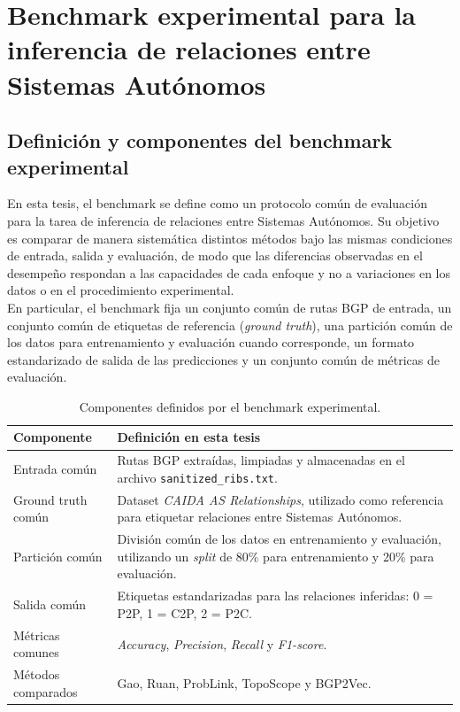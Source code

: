 \section{Benchmark experimental para la inferencia de relaciones entre Sistemas Autónomos} \label{sec:Benchmark_section}
\subsection{Definición y componentes del benchmark experimental}
\label{sec:definicion_benchmark}

En esta tesis, el benchmark se define como un protocolo común de evaluación para la tarea de inferencia de relaciones entre Sistemas Autónomos. 
Su objetivo es comparar de manera sistemática distintos métodos bajo las mismas condiciones de entrada, salida y evaluación, de modo que las diferencias 
observadas en el desempeño respondan a las capacidades de cada enfoque y no a variaciones en los datos o en el procedimiento experimental.\\

En particular, el benchmark fija un conjunto común de rutas BGP de entrada, un conjunto común de etiquetas de referencia (\textit{ground truth}), una partición 
común de los datos para entrenamiento y evaluación cuando corresponde, un formato estandarizado de salida de las predicciones y un conjunto común de métricas 
de evaluación.\\

\begin{table}[h]
\centering
\caption{Componentes definidos por el benchmark experimental.}
\label{tab:benchmark_componentes}
\begin{tabular}{p{4.2cm} p{9.3cm}}
\hline
\textbf{Componente} & \textbf{Definición en esta tesis} \\
\hline
Entrada común & Rutas BGP extraídas, limpiadas y almacenadas en el archivo \texttt{sanitized\_ribs.txt}. \\
Ground truth común & Dataset \textit{CAIDA AS Relationships}, utilizado como referencia para etiquetar relaciones entre Sistemas Autónomos. \\
Partición común & División común de los datos en entrenamiento y evaluación, utilizando un \textit{split} de 80\% para entrenamiento y 20\% para evaluación. \\
Salida común & Etiquetas estandarizadas para las relaciones inferidas: 0 = P2P, 1 = C2P, 2 = P2C. \\
Métricas comunes & \textit{Accuracy}, \textit{Precision}, \textit{Recall} y \textit{F1-score}. \\
Métodos comparados & Gao, Ruan, ProbLink, TopoScope y BGP2Vec. \\
\hline
\end{tabular}
\end{table}


